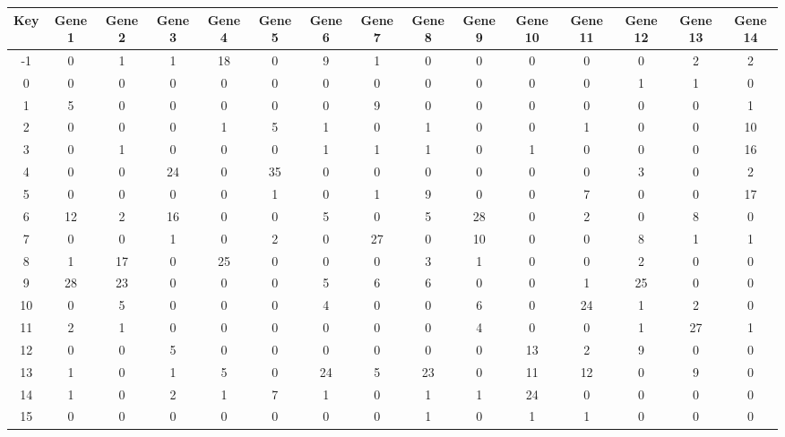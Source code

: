 \begin{tabular}{|c|c|c|c|c|c|c|c|c|c|c|c|c|c|c|}
\hline
Key & Gene 1 & Gene 2 & Gene 3 & Gene 4 & Gene 5 & Gene 6 & Gene 7 & Gene 8 & Gene 9 & Gene 10 & Gene 11 & Gene 12 & Gene 13 & Gene 14 \\
\hline
-1 & 0 & 1 & 1 & 18 & 0 & 9 & 1 & 0 & 0 & 0 & 0 & 0 & 2 & 2 \\
0 & 0 & 0 & 0 & 0 & 0 & 0 & 0 & 0 & 0 & 0 & 0 & 1 & 1 & 0 \\
1 & 5 & 0 & 0 & 0 & 0 & 0 & 9 & 0 & 0 & 0 & 0 & 0 & 0 & 1 \\
2 & 0 & 0 & 0 & 1 & 5 & 1 & 0 & 1 & 0 & 0 & 1 & 0 & 0 & 10 \\
3 & 0 & 1 & 0 & 0 & 0 & 1 & 1 & 1 & 0 & 1 & 0 & 0 & 0 & 16 \\
4 & 0 & 0 & 24 & 0 & 35 & 0 & 0 & 0 & 0 & 0 & 0 & 3 & 0 & 2 \\
5 & 0 & 0 & 0 & 0 & 1 & 0 & 1 & 9 & 0 & 0 & 7 & 0 & 0 & 17 \\
6 & 12 & 2 & 16 & 0 & 0 & 5 & 0 & 5 & 28 & 0 & 2 & 0 & 8 & 0 \\
7 & 0 & 0 & 1 & 0 & 2 & 0 & 27 & 0 & 10 & 0 & 0 & 8 & 1 & 1 \\
8 & 1 & 17 & 0 & 25 & 0 & 0 & 0 & 3 & 1 & 0 & 0 & 2 & 0 & 0 \\
9 & 28 & 23 & 0 & 0 & 0 & 5 & 6 & 6 & 0 & 0 & 1 & 25 & 0 & 0 \\
10 & 0 & 5 & 0 & 0 & 0 & 4 & 0 & 0 & 6 & 0 & 24 & 1 & 2 & 0 \\
11 & 2 & 1 & 0 & 0 & 0 & 0 & 0 & 0 & 4 & 0 & 0 & 1 & 27 & 1 \\
12 & 0 & 0 & 5 & 0 & 0 & 0 & 0 & 0 & 0 & 13 & 2 & 9 & 0 & 0 \\
13 & 1 & 0 & 1 & 5 & 0 & 24 & 5 & 23 & 0 & 11 & 12 & 0 & 9 & 0 \\
14 & 1 & 0 & 2 & 1 & 7 & 1 & 0 & 1 & 1 & 24 & 0 & 0 & 0 & 0 \\
15 & 0 & 0 & 0 & 0 & 0 & 0 & 0 & 1 & 0 & 1 & 1 & 0 & 0 & 0 \\
\hline
\end{tabular}